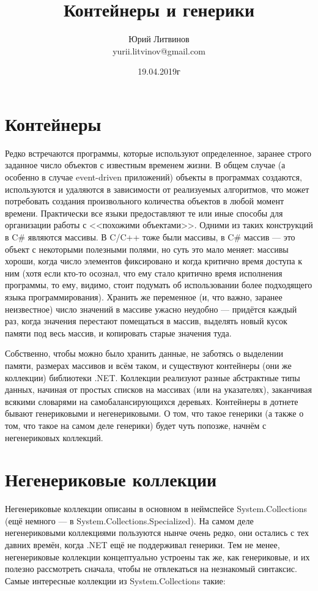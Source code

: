 \documentclass[a5paper]{article}
\title{Контейнеры и генерики}
\author{Юрий Литвинов\\\small{yurii.litvinov@gmail.com}}
\date{19.04.2019г}
\begin{document}
\maketitle
\thispagestyle{empty}

\section{Контейнеры}

Редко встречаются программы, которые используют определенное, заранее строго заданное число объектов с известным временем жизни. В общем случае (а особенно в случае event-driven приложений) объекты в программах создаются, используются и удаляются в зависимости от реализуемых алгоритмов, что может потребовать создания произвольного количества объектов в любой момент времени. Практически все языки предоставляют те или иные способы для организации работы с <<похожими объектами>>. Одними из таких конструкций в C\# являются массивы. В C/C++ тоже были массивы, в C\# массив --- это объект с некоторыми полезными полями, но суть это мало меняет: массивы хороши, когда число элементов фиксировано и когда критично время доступа к ним (хотя если кто-то осознал, что ему стало критично время исполнения программы, то ему, видимо, стоит подумать об использовании более подходящего языка программирования). Хранить же переменное (и, что важно, заранее неизвестное) число значений в массиве ужасно неудобно --- придётся каждый раз, когда значения перестают помещаться в массив, выделять новый кусок памяти под весь массив, и копировать старые значения туда.

Собственно, чтобы можно было хранить данные, не заботясь о выделении памяти, размерах массивов и всём таком, и существуют контейнеры (они же коллекции) библиотеки .NET. Коллекции реализуют разные абстрактные типы данных, начиная от простых списков на массивах (или на указателях), заканчивая всякими словарями на самобалансирующихся деревьях. Контейнеры в дотнете бывают генериковыми и негенериковыми. О том, что такое генерики (а также о том, что такое на самом деле генерики) будет чуть попозже, начнём с негенериковых коллекций.

\section{Негенериковые коллекции}

Негенериковые коллекции описаны в основном в неймспейсе System.Collections (ещё немного --- в System.Collections.Specialized). На самом деле негенериковыми коллекциями пользуются нынче очень редко, они остались с тех давних времён, когда .NET ещё не поддерживал генерики. Тем не менее, негенериковые коллекции концептуально устроены так же, как генериковые, и их полезно рассмотреть сначала, чтобы не отвлекаться на незнакомый синтаксис. Самые интересные коллекции из System.Collections такие:
\end{document}

